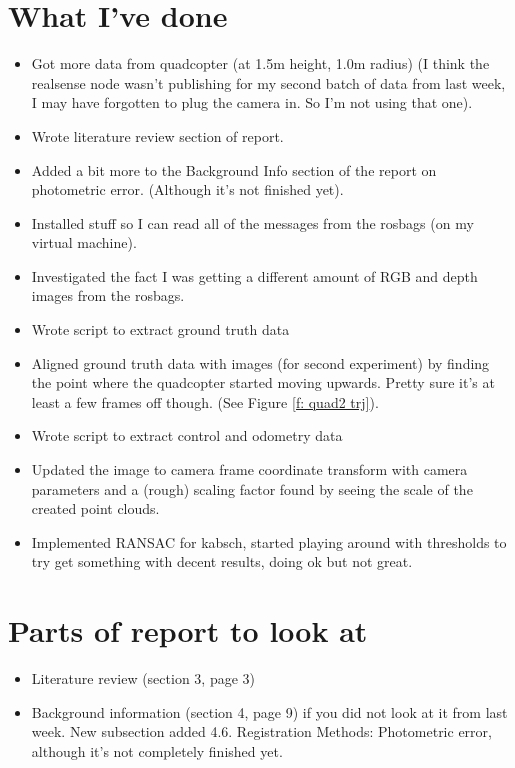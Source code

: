 \documentclass[12pt,a4paper]{article}
\begin{document}
\author{Katrina Ashton}


\pagestyle{fancy}
\fancyhf{}
\rhead{\thepage}

\section{What I've done}
\begin{itemize}
\item Got more data from quadcopter (at 1.5m height, 1.0m radius) (I think the realsense node wasn't publishing for my second batch of data from last week, I may have forgotten to plug the camera in. So I'm not using that one).
\item Wrote literature review section of report.
\item Added a bit more to the Background Info section of the report on photometric error. (Although it's not finished yet).
\item Installed stuff so I can read all of the messages from the rosbags (on my virtual machine).
\item Investigated the fact I was getting a different amount of RGB and depth images from the rosbags.
\item Wrote script to extract ground truth data
\item Aligned ground truth data with images (for second experiment) by finding the point where the quadcopter started moving upwards. Pretty sure it's at least a few frames off though. (See Figure \ref{f: quad2 trj}).
\item Wrote script to extract control and odometry data
\item Updated the image to camera frame coordinate transform with camera parameters and a (rough) scaling factor found by seeing the scale of the created point clouds.
\item Implemented RANSAC for kabsch, started playing around with thresholds to try get something with decent results, doing ok but not great.
\end{itemize}

\section{Parts of report to look at}
\begin{itemize}
\item Literature review (section 3, page 3)
\item Background information (section 4, page 9) if you did not look at it from last week. New subsection added 4.6. Registration Methods: Photometric error, although it's not completely finished yet.
\end{itemize}
\end{document}
